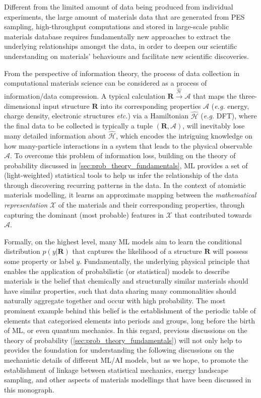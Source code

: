 Different from the limited amount of data being produced from individual experiments, the large amount of materials data that are generated from PES sampling, high-throughput computations and stored in large-scale public materials database requires fundamentally new approaches to extract the underlying relationships amongst the data, in order to deepen our scientific understanding on materials' behaviours and facilitate new scientific discoveries. 

From the perspective of information theory, the process of data collection in computational materials science can be considered as a process of information/data compression. A typical calculation $\bm{R}\xrightarrow{\hat{\mathcal{H}}}\mathcal{A}$ that maps the three-dimensional input structure $\bm{R}$ into its corresponding properties $\mathcal{A}$ (\emph{e.g.} energy, charge density, electronic structures \emph{etc.}) via a Hamiltonian $\hat{\mathcal{H}}$ (\emph{e.g.} DFT), where the final data to be collected is typically a tuple $(\bm{R},\mathcal{A})$, will inevitably lose many detailed information about $\hat{\mathcal{H}}$, which encodes the intriguing knowledge on how many-particle interactions in a system that leads to the physical observable $\mathcal{A}$. To overcome this problem of information loss, building on the theory of probability discussed in \cref{sec:prob_theory_fundamentals}, ML provides a set of (light-weighted) statistical tools to help us infer the relationship of the data through discovering recurring patterns in the data. In the context of atomistic materials modelling, it learns an approximate mapping between the \emph{mathematical representation} $\mathcal{X}$ of the materials and their corresponding properties, through capturing the dominant (most probable) features in $\mathcal{X}$ that contributed towards $\mathcal{A}$. 

Formally, on the highest level, many ML models aim to learn the conditional distribution $p(y|\bm{R})$ that captures the likelihood of a structure $\bm{R}$ will possess some property or label $y$. Fundamentally, the underlying physical principle that enables the application of probabilistic (or statistical) models to describe materials is the belief that chemically and structurally similar materials should have similar properties, such that data sharing many commonalities should naturally aggregate together and occur with high probability. The most prominent example behind this belief is the establishment of the periodic table of elements that categorised elements into periods and groups, long before the birth of ML, or even quantum mechanics. In this regard, previous discussions on the theory of probability (\cref{sec:prob_theory_fundamentals}) will not only help to provides the foundation for understanding the following discussions on the mechanistic details of different ML/AI models, but as we hope, to promote the establishment of linkage between statistical mechanics, energy landscape sampling, and other aspects of materials modellings that have been discussed in this monograph. 

